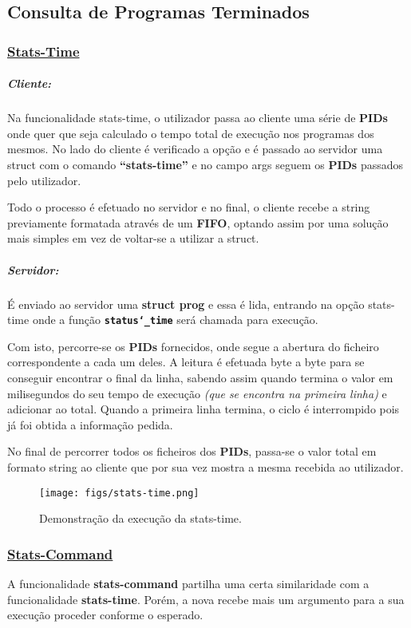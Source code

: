 \documentclass{report}
\begin{document}
\subsection{Consulta de Programas Terminados}

\subsubsection{\underline{Stats-Time}}
\subparagraph{Cliente:} Na funcionalidade stats-time, o utilizador passa ao cliente uma série de \textbf{PIDs} onde quer que seja calculado o tempo total de execução nos programas dos mesmos.
No lado do cliente é verificado a opção e é passado ao servidor uma struct com o comando \textbf{“stats-time”} e no campo args seguem os \textbf{PIDs} passados pelo utilizador.\par
Todo o processo é efetuado no servidor e no final, o cliente recebe a string previamente formatada através de um \textbf{FIFO}, optando assim por uma solução mais simples em vez de voltar-se a utilizar a struct.

\subparagraph{Servidor:} É enviado ao servidor uma \textbf{struct prog} e essa é lida, entrando na opção stats-time onde a função \textbf{\texttt{status\char`_time}} será chamada para execução. \par
Com isto, percorre-se os \textbf{PIDs} fornecidos, onde segue a abertura do ficheiro correspondente a cada um deles. A leitura é efetuada byte a byte para se conseguir encontrar o final da linha, sabendo assim quando termina o valor em milisegundos do seu tempo de execução \textit{(que se encontra na primeira linha)} e adicionar ao total. Quando a primeira linha termina, o ciclo é interrompido pois já foi obtida a informação pedida.\par
No final de percorrer todos os ficheiros dos \textbf{PIDs}, passa-se o valor total em formato string ao cliente que por sua vez mostra a mesma recebida ao utilizador.

\begin{figure}[h]
    \centering
    \texttt{[image: figs/stats-time.png]}
    \caption{Demonstração da execução da stats-time.}
    \label{f}
\end{figure}

\subsubsection{\underline{Stats-Command}}
A funcionalidade \textbf{stats-command} partilha uma certa similaridade com a funcionalidade \textbf{stats-time}. Porém, a nova recebe mais um argumento para a sua execução proceder conforme o esperado.
\end{document}
